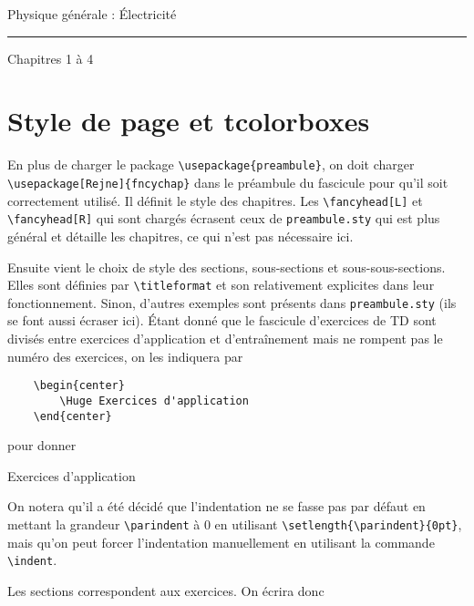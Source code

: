 \documentclass[10pt,a5paper,notitlepage]{book}
\newlength\tindent
\renewcommand{\indent}{\hspace*{\tindent}}
\begin{document}
\begin{center}
\Huge Physique générale : Électricité\smallbreak\vspace*{-14pt}
\rule[11pt]{5cm}{0.5pt}\smallbreak\vspace*{-14pt}
\huge Chapitres 1 à 4
\end{center}

\toccontents

\chapter{Style de page et tcolorboxes}
\vspace*{-47pt}

En plus de charger le package \verb=\usepackage{preambule}=, on doit charger
\verb=\usepackage[Rejne]{fncychap}= dans le préambule du fascicule pour qu'il
soit correctement utilisé. Il définit le style des chapitres. Les
\verb=\fancyhead[L]= et \verb=\fancyhead[R]= qui sont chargés écrasent ceux de
\verb=preambule.sty= qui est plus général et détaille les chapitres, ce qui
n'est pas nécessaire ici. \bigbreak

Ensuite vient le choix de style des sections, sous-sections et
sous-sous-sections. Elles sont définies par \verb=\titleformat= et son
relativement explicites dans leur fonctionnement. Sinon, d'autres exemples sont
présents dans \verb=preambule.sty= (ils se font aussi écraser ici). Étant donné
que le fascicule d'exercices de TD sont divisés entre exercices d'application et
d'entraînement mais ne rompent pas le numéro des exercices, on les indiquera par

\begin{verbatim}
    \begin{center}
        \Huge Exercices d'application
    \end{center}
\end{verbatim}

pour donner

\begin{center}
    \Huge Exercices d'application
\end{center}

On notera qu'il a été décidé que l'indentation ne se fasse pas par défaut en
mettant la grandeur \verb=\parindent= à 0 en utilisant
\verb=\setlength{\parindent}{0pt}=, mais qu'on peut forcer l'indentation
manuellement en utilisant la commande \verb=\indent=. \bigbreak

Les sections correspondent aux exercices. On écrira donc
\end{document}
